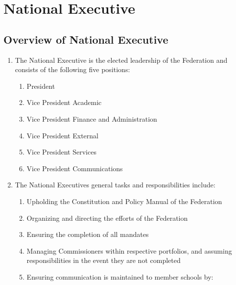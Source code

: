 \section{National Executive}
\label{national-executive}

\subsection{Overview of National Executive}
\label{overview-of-national-executive}

\begin{enumerate}
 \item
  The National Executive is the elected leadership of the Federation and consists of the following five positions:

  \begin{enumerate}
   \item
    President
   \item
    Vice President Academic
   \item
    Vice President Finance and Administration
   \item
    Vice President External
   \item
    Vice President Services
   \item
    Vice President Communications

  \end{enumerate}

 \item
  The National Executive\textquotesingle s general tasks and responsibilities include:
  \begin{enumerate}
   \item
    Upholding the Constitution and Policy Manual of the Federation
   \item
    Organizing and directing the efforts of the Federation
   \item
    Ensuring the completion of all mandates
   \item
    Managing Commissioners within respective portfolios, and assuming responsibilities in the event they are not completed
   \item
    Ensuring communication is maintained to member schools by:


\end{enumerate}
\end{enumerate}
